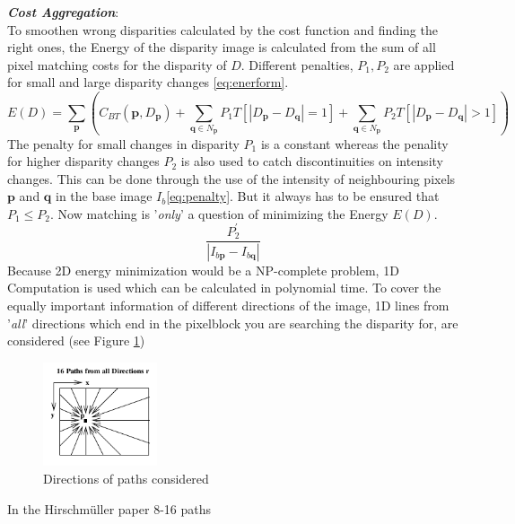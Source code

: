 \documentclass[a4paper]{article}
\begin{document}
\emph{\textbf{Cost Aggregation}}:\\ 
To smoothen wrong disparities calculated by the cost function and
finding the right ones, the Energy of the disparity image is
calculated from the sum of all pixel matching costs for the disparity
of $D$. Different penalties, $P_1, P_2$ are applied for small and
large disparity changes \eqref{eq:enerform}.
\begin{equation}
E(D) = \displaystyle\sum\limits_{\mathbf{p}}
(C_{BT}(\mathbf{p},D_\mathbf{p}) +
\displaystyle\sum\limits_{\mathbf{q} \in N_\mathbf{p}} P_1
T[|D_\mathbf{p} - D_\mathbf{q}| = 1] +
\displaystyle\sum\limits_{\mathbf{q} \in N_\mathbf{p}} P_2
T[|D_\mathbf{p} - D_\mathbf{q}| > 1]) 
  \label{eq:enerform}
\end{equation}
The 
penalty for small changes in disparity $P_1$ is a constant
whereas the penality for higher disparity changes $P_2$ is also used
to catch discontinuities on intensity changes. This can be done
through the use of the intensity of neighbouring pixels $\mathbf{p}$
and $\mathbf{q}$ in the base image $I_b$\eqref{eq:penalty}.
But it always has to be ensured that $P_1 \leq P_2$. Now matching
is '\textit{only}' a question of minimizing the Energy $E(D)$.
\begin{equation}
  \displaystyle\frac{P_{2}^{'}}{|I_{b\mathbf{p}}-I_{b\mathbf{q}}|}
\label{eq:penalty}
\end{equation}
Because 2D energy minimization would be a NP-complete problem, 1D
Computation is used which can be calculated in polynomial time. To
cover the equally important information of different directions of the
image, 1D lines from '\textit{all}' directions which end in the
pixelblock you are searching the disparity for, are considered (see
Figure \ref{fig:directions})
\begin{figure}
  \centering
  \includegraphics[width=0.3\textwidth]{directions}
  \caption{Directions of paths considered}
  \label{fig:directions}
\end{figure}
\noindent In the Hirschm\"{u}ller paper 8-16 paths
\end{document}
